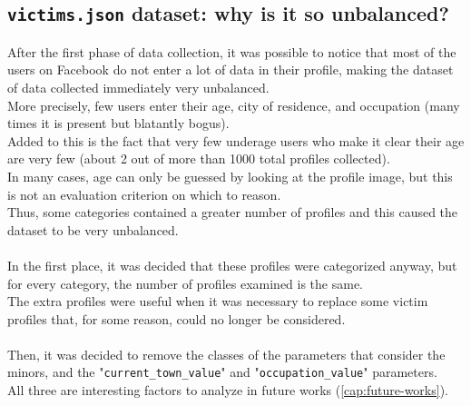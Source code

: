 \subsection{\texttt{victims.json} dataset: why is it so unbalanced?}
\label{cap:discuss-dataset-victims}
After the first phase of data collection, it was possible to notice that most of the users on Facebook do not enter a lot of data in their profile, making the dataset of data collected immediately very unbalanced.\\More precisely, few users enter their age, city of residence, and occupation (many times it is present but blatantly bogus).\\Added to this is the fact that very few underage users who make it clear their age are very few (about 2 out of more than 1000 total profiles collected).\\In many cases, age can only be guessed by looking at the profile image, but this is not an evaluation criterion on which to reason.\\Thus, some categories contained a greater number of profiles and this caused the dataset to be very unbalanced.\\\\In the first place, it was decided that these profiles were categorized anyway, but for every category, the number of profiles examined is the same.\\The extra profiles were useful when it was necessary to replace some victim profiles that, for some reason, could no longer be considered.
\\\\Then, it was decided to remove the classes of the parameters that consider the minors, and the "\texttt{current\_town\_value}" and "\texttt{occupation\_value}" parameters.\\All three are interesting factors to analyze in future works (\ref{cap:future-works}).
